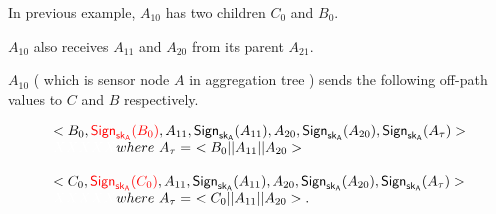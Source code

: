 \documentclass[%
  slidesonly,%
  semlayer%
  ]{seminar}                                  %
\newcommand{\sk}{\sf{sk}}
\begin{document}
\begin{slide}
        In previous example, $A_{10}$ has two children $C_{0}$ and $B_{0}$.
        
        $A_{10}$ also receives $A_{11}$ and $A_{20}$ from its parent $A_{21}$.
        
        $A_{10}$ ( which is sensor node $A$ in aggregation tree ) sends the following off-path values to $C$ and $B$ respectively.
        
        
        
        \begin{equation*}
          \begin{array}{l}
            <B_{0}, \textcolor{red}{\textsf{Sign}_{\sk_{A}}(B_{0})},A_{11},\textsf{Sign}_{\sk_{A}}(A_{11}),A_{20},\textsf{Sign}_{\sk_{A}}(A_{20}),\textsf{Sign}_{\sk_{A}}(A_{\tau})>\\
              \textcolor{white}{XXXXX}where\  A_{\tau} =\ <B_{0}||A_{11}||A_{20}>\\
           \\
            <C_{0}, \textcolor{red}{\textsf{Sign}_{\sk_{A}}(C_{0})},A_{11},\textsf{Sign}_{\sk_{A}}(A_{11}),A_{20},\textsf{Sign}_{\sk_{A}}(A_{20}),\textsf{Sign}_{\sk_{A}}(A_{\tau})>\\ 
              \textcolor{white}{XXXXX}where\  A_{\tau} =\ <C_{0}||A_{11}||A_{20}>.
          \end{array}
        \end{equation*}
        \vfill
        \clearpage


\end{slide}
\end{document}
